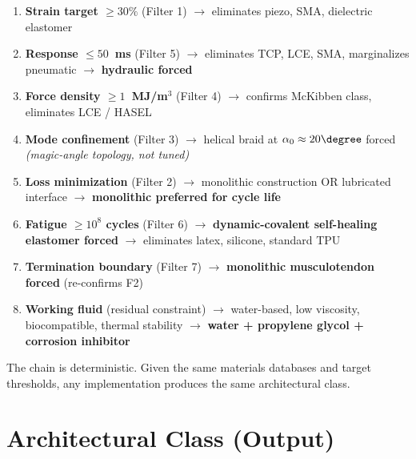 \documentclass[11pt, a4paper]{article}
\begin{document}
\begin{enumerate}
  \item \textbf{Strain target $\geq 30\%$} (Filter 1) $\to$
        eliminates piezo, SMA, dielectric elastomer

  \item \textbf{Response $\leq 50$~ms} (Filter 5) $\to$
        eliminates TCP, LCE, SMA, marginalizes pneumatic
        $\to$ \textbf{hydraulic forced}

  \item \textbf{Force density $\geq 1$~MJ/m$^3$} (Filter 4) $\to$
        confirms McKibben class, eliminates LCE / HASEL

  \item \textbf{Mode confinement} (Filter 3) $\to$
        helical braid at $\alpha_0 \approx 20\degree$ forced
        \textit{(magic-angle topology, not tuned)}

  \item \textbf{Loss minimization} (Filter 2) $\to$
        monolithic construction OR lubricated interface
        $\to$ \textbf{monolithic preferred for cycle life}

  \item \textbf{Fatigue $\geq 10^8$ cycles} (Filter 6) $\to$
        \textbf{dynamic-covalent self-healing elastomer forced}
        $\to$ eliminates latex, silicone, standard TPU

  \item \textbf{Termination boundary} (Filter 7) $\to$
        \textbf{monolithic musculotendon forced} (re-confirms F2)

  \item \textbf{Working fluid} (residual constraint) $\to$
        water-based, low viscosity, biocompatible, thermal
        stability $\to$ \textbf{water + propylene glycol +
        corrosion inhibitor}
\end{enumerate}

The chain is deterministic. Given the same materials databases and
target thresholds, any implementation produces the same
architectural class.

\section{Architectural Class (Output)}
\end{document}
